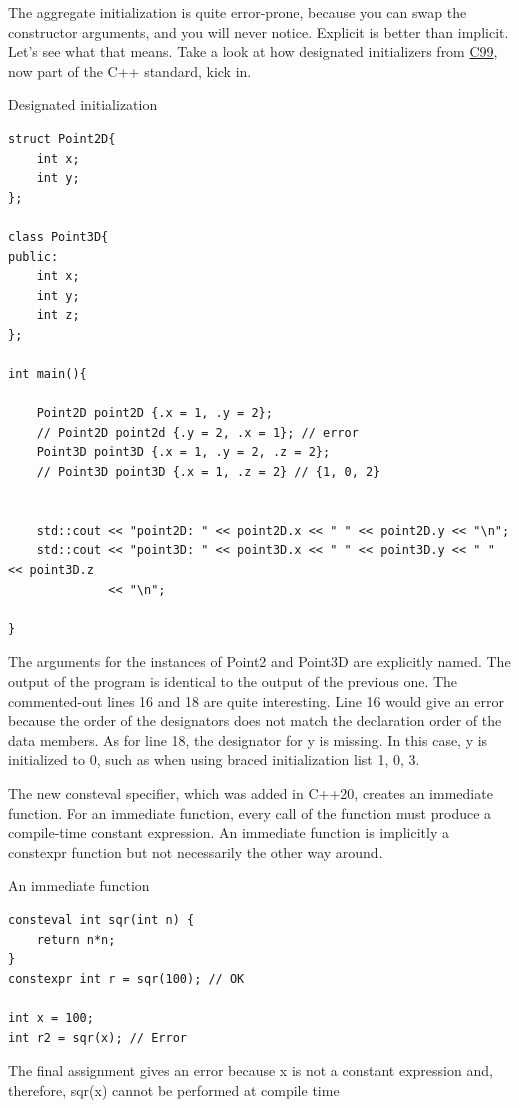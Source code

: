 The aggregate initialization is quite error-prone, because you can swap the constructor arguments, and you will never notice. Explicit is better than implicit. Let’s see what that means. Take a look at how designated initializers from \href{https://en.wikipedia.org/wiki/C99}{C99}, now part of the C++ standard, kick in.

\noindent
Designated initialization
\begin{lstlisting}[style=styleCXX]
struct Point2D{
	int x;
	int y;
};

class Point3D{
public:
	int x;
	int y;
	int z;
};

int main(){

	Point2D point2D {.x = 1, .y = 2};
	// Point2D point2d {.y = 2, .x = 1}; // error
	Point3D point3D {.x = 1, .y = 2, .z = 2};
	// Point3D point3D {.x = 1, .z = 2} // {1, 0, 2}


	std::cout << "point2D: " << point2D.x << " " << point2D.y << "\n";
	std::cout << "point3D: " << point3D.x << " " << point3D.y << " " << point3D.z
		      << "\n";

}
\end{lstlisting}

The arguments for the instances of Point2 and Point3D are explicitly named. The output of the program is identical to the output of the previous one. The commented-out lines 16 and 18 are quite interesting. Line 16 would give an error because the order of the designators does not match the declaration order of the data members. As for line 18, the designator for y is missing. In this case, y is initialized to 0, such as when using braced initialization list {1, 0, 3}.


The new consteval specifier, which was added in C++20, creates an immediate function. For an immediate function, every call of the function must produce a compile-time constant expression.
An immediate function is implicitly a constexpr function but not necessarily the other way around.

\noindent
An immediate function
\begin{lstlisting}[style=styleCXX]
consteval int sqr(int n) {
	return n*n;
}
constexpr int r = sqr(100); // OK

int x = 100;
int r2 = sqr(x); // Error
\end{lstlisting}

The final assignment gives an error because x is not a constant expression and, therefore, sqr(x) cannot be performed at compile time 


